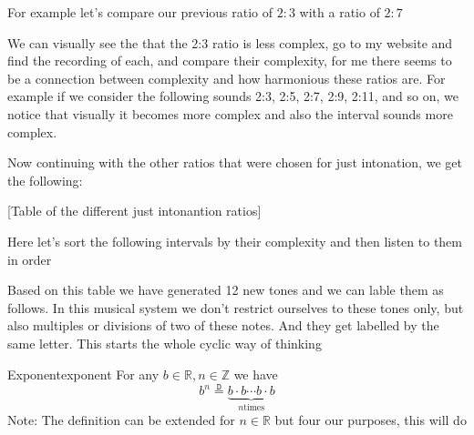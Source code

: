 For example let's compare our previous ratio of $2:3$ with a ratio of $2: 7$ 

\begin{center}
\end{center}
              

We can visually see the that the 2:3 ratio is less complex, go to my website and find the recording of each, and compare their complexity, for me there seems to be a connection between complexity and how harmonious these ratios are. For example if we consider the following sounds 2:3, 2:5, 2:7, 2:9, 2:11, and so on, we notice that visually it becomes more complex and also the interval sounds more complex.

Now continuing with the other ratios that were chosen for just intonation, we get the following:

[Table of the different just intonantion ratios]

Here let's sort the following intervals by their complexity and then listen to them in order

Based on this table we have generated 12 new tones and we can lable them as follows. In this musical system we don't restrict ourselves to these tones only, but also multiples or divisions of two of these notes. And they get labelled by the same letter. This starts the whole cyclic way of thinking

\begin{definition}{Exponent}{exponent}
  For any $ b \in \mathbb{R}, n \in \mathbb{Z}$ we have
  \[
    b ^{n} \stackrel{\mathtt{D}}{=} \underbrace{b  \cdot b \dotsb b  \cdot b}_{n \text{times}}
  \]
  Note: The definition can be extended for $ n \in \mathbb{R}$ but four our purposes, this will do
\end{definition}

